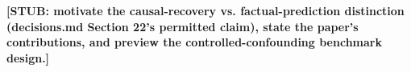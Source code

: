 \textbf{[STUB: motivate the causal-recovery vs. factual-prediction
distinction (decisions.md Section 22's permitted claim), state the paper's
contributions, and preview the controlled-confounding benchmark design.]}

